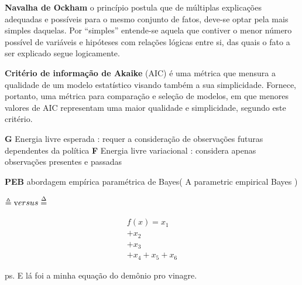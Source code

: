 \documentclass[
  12pt,
]{book}
\begin{document}
\textbf{Navalha de Ockham} o princípio postula que de múltiplas explicações adequadas e possíveis para o mesmo conjunto de fatos, deve-se optar pela mais simples daquelas. Por ``simples'' entende-se aquela que contiver o menor número possível de variáveis e hipóteses com relações lógicas entre si, das quais o fato a ser explicado segue logicamente.

\textbf{Critério de informação de Akaike} (AIC) é uma métrica que mensura a qualidade de um modelo estatístico visando também a sua simplicidade. Fornece, portanto, uma métrica para comparação e seleção de modelos, em que menores valores de AIC representam uma maior qualidade e simplicidade, segundo este critério.

\textbf{G} Energia livre esperada : requer a consideração de observações futuras dependentes da política
\textbf{F} Energia livre variacional : considera apenas observações presentes e passadas

\textbf{PEB} abordagem empírica paramétrica de Bayes( A parametric empirical Bayes )

\(\triangleq \text versus \overset{\Delta}{=}\)

\[ \begin{align} f(x) =  x_1  \\+ x_2 \\ + x_3 \\ + x_4 + x_5 + x_6\end{align}\]

ps. E lá foi a minha equação do demônio pro vinagre.

  
\end{document}
